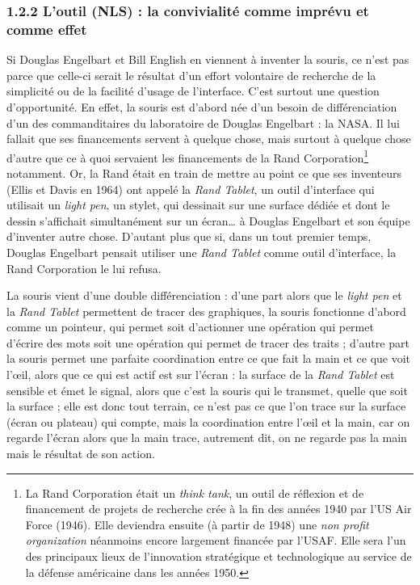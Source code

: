 \documentclass{FramateX}
\begin{document}
\begin{refsection}
\subsubsection*{1.2.2 L'outil (NLS) : la convivialité comme imprévu et comme effet}
{}

Si Douglas Engelbart et Bill English en viennent à inventer la souris,
ce n'est pas parce que celle-ci serait le résultat d'un effort
volontaire de recherche de la simplicité ou de la facilité d'usage de
l'interface. C'est surtout une question d'opportunité. En effet, la
souris est d'abord née d'un besoin de différenciation d'un des
commanditaires du laboratoire de Douglas Engelbart : la NASA. Il lui
fallait que ses financements servent à quelque chose, mais surtout à
quelque chose d'autre que ce à quoi servaient les financements de la
Rand Corporation\footnote{La Rand Corporation était un \textit{think tank}, un
outil de réflexion et de financement de projets de recherche crée à la
fin des années 1940 par l'US Air Force (1946). Elle deviendra ensuite (à
partir de 1948) une \textit{non profit organization} néanmoins encore
largement financée par l'USAF. Elle sera l'un des principaux lieux de
l'innovation stratégique et technologique au service de la défense
américaine dans les années 1950.} notamment. Or, la Rand était en train de mettre
 au point ce que ses inventeurs (Ellis et Davis
en 1964) ont appelé la \textit{Rand Tablet}, un outil d'interface qui utilisait
un \textit{light pen}, un stylet, qui dessinait sur une surface dédiée et
dont le dessin s'affichait simultanément sur un écran… à Douglas
Engelbart et son équipe d'inventer autre chose. D'autant plus que si, dans un tout premier temps, Douglas Engelbart
pensait utiliser une \textit{Rand Tablet} comme outil d'interface, la Rand
Corporation le lui refusa. 

La souris vient d'une double différenciation : d'une part alors que le
\textit{light pen} et la \textit{Rand Tablet} permettent de tracer des graphiques, la
souris fonctionne d'abord comme un pointeur, qui permet soit
d'actionner une opération qui permet d'écrire des mots soit une
opération qui permet de tracer des traits ; d'autre part la souris
permet une parfaite coordination entre ce que fait la main et ce que
voit l'œil, alors que ce qui est actif est sur l'écran : la surface de
la \textit{Rand Tablet} est sensible et émet le signal, alors que c'est la
souris qui le transmet, quelle que soit la surface ; elle est donc tout
terrain, ce n'est pas ce que l'on trace sur la surface (écran ou
plateau) qui compte, mais la coordination entre l'œil et la main, car
on regarde l'écran alors que la main trace, autrement dit, on ne
regarde pas la main mais le résultat de son action.


\end{refsection}
\end{document}
